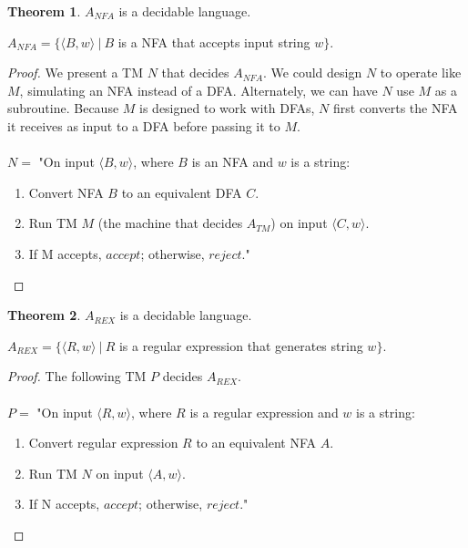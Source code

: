 \documentclass[11pt]{article}
\theoremstyle{definition}
\newtheorem{thm}{Theorem}[section]
\begin{document}
\begin{thm}
    $A_{NFA}$ is a decidable language.
    \begin{center}
        $A_{NFA} = \{\langle B,w\rangle\ |\ B$ is a NFA that accepts input string $w\}$.
    \end{center}
\end{thm}
\begin{proof}
    We present a TM $N$ that decides $A_{NFA}$. We could design $N$ to operate like $M$, simulating an NFA instead of a DFA. Alternately, we can have $N$ use $M$ as a subroutine. Because $M$ is designed to work with DFAs, $N$ first converts the NFA it receives as input to a DFA before passing it to $M$.\\\\
$N =$ "On input $\langle B, w\rangle$, where $B$ is an NFA and $w$ is a string:
\begin{enumerate}
    \item Convert NFA $B$ to an equivalent DFA $C$.
    \item Run TM $M$ (the machine that decides $A_{TM}$) on input $\langle C, w\rangle$.
    \item If M accepts, $accept$; otherwise, $reject$."
\end{enumerate}
\end{proof}

\begin{thm}
    $A_{REX}$ is a decidable language.
    \begin{center}
        $A_{REX} = \{\langle R,w\rangle\ |\ R$ is a regular expression that generates string $w\}$.
    \end{center}
\end{thm}
\begin{proof}
    The following TM $P$ decides $A_{REX}$.\\\\
$P =$ "On input $\langle R, w\rangle$, where $R$ is a regular expression and $w$ is a string:
\begin{enumerate}
    \item Convert regular expression $R$ to an equivalent NFA $A$.
    \item Run TM $N$ on input $\langle A, w\rangle$.
    \item If N accepts, $accept$; otherwise, $reject$."
\end{enumerate}
\end{proof}
\end{document}
